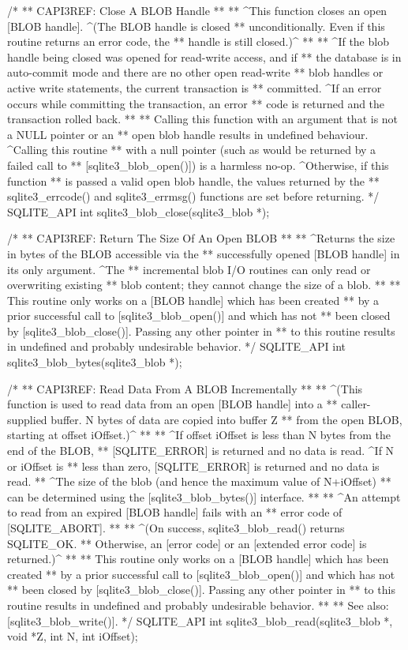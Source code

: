 \begin{Codex}[label=sqlite3.h,numbers=left]
{/*
** CAPI3REF: Close A BLOB Handle
**
** ^This function closes an open [BLOB handle]. ^(The BLOB handle is closed
** unconditionally.  Even if this routine returns an error code, the 
** handle is still closed.)^
**
** ^If the blob handle being closed was opened for read-write access, and if
** the database is in auto-commit mode and there are no other open read-write
** blob handles or active write statements, the current transaction is
** committed. ^If an error occurs while committing the transaction, an error
** code is returned and the transaction rolled back.
**
** Calling this function with an argument that is not a NULL pointer or an
** open blob handle results in undefined behaviour. ^Calling this routine 
** with a null pointer (such as would be returned by a failed call to 
** [sqlite3_blob_open()]) is a harmless no-op. ^Otherwise, if this function
** is passed a valid open blob handle, the values returned by the 
** sqlite3_errcode() and sqlite3_errmsg() functions are set before returning.
*/
SQLITE_API int sqlite3_blob_close(sqlite3_blob *);

/*
** CAPI3REF: Return The Size Of An Open BLOB
**
** ^Returns the size in bytes of the BLOB accessible via the 
** successfully opened [BLOB handle] in its only argument.  ^The
** incremental blob I/O routines can only read or overwriting existing
** blob content; they cannot change the size of a blob.
**
** This routine only works on a [BLOB handle] which has been created
** by a prior successful call to [sqlite3_blob_open()] and which has not
** been closed by [sqlite3_blob_close()].  Passing any other pointer in
** to this routine results in undefined and probably undesirable behavior.
*/
SQLITE_API int sqlite3_blob_bytes(sqlite3_blob *);

/*
** CAPI3REF: Read Data From A BLOB Incrementally
**
** ^(This function is used to read data from an open [BLOB handle] into a
** caller-supplied buffer. N bytes of data are copied into buffer Z
** from the open BLOB, starting at offset iOffset.)^
**
** ^If offset iOffset is less than N bytes from the end of the BLOB,
** [SQLITE_ERROR] is returned and no data is read.  ^If N or iOffset is
** less than zero, [SQLITE_ERROR] is returned and no data is read.
** ^The size of the blob (and hence the maximum value of N+iOffset)
** can be determined using the [sqlite3_blob_bytes()] interface.
**
** ^An attempt to read from an expired [BLOB handle] fails with an
** error code of [SQLITE_ABORT].
**
** ^(On success, sqlite3_blob_read() returns SQLITE_OK.
** Otherwise, an [error code] or an [extended error code] is returned.)^
**
** This routine only works on a [BLOB handle] which has been created
** by a prior successful call to [sqlite3_blob_open()] and which has not
** been closed by [sqlite3_blob_close()].  Passing any other pointer in
** to this routine results in undefined and probably undesirable behavior.
**
** See also: [sqlite3_blob_write()].
*/
SQLITE_API int sqlite3_blob_read(sqlite3_blob *, void *Z, int N, int iOffset);

}
\end{Codex}
